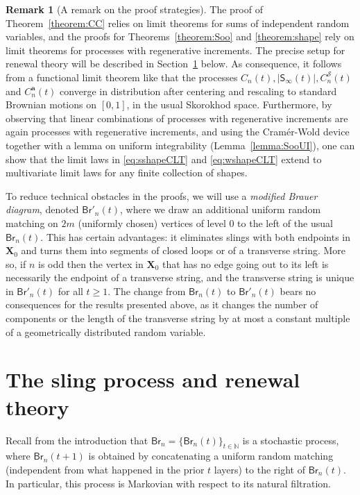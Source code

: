 \documentclass[a4paper,11pt,reqno]{amsart}
\newcommand{\IN}{\mathbb{N}}
\newcommand{\Br}{\mathsf{Br}}
\newcommand{\Soo}{\mathsf{S}_\infty}
\newcommand{\shape}{\mathscr{S}}
\newcommand{\mb}{\mathbf}
\theoremstyle{definition}
\newtheorem{remark}[lemma]{Remark}
\begin{document}
\begin{remark}[A remark on the proof strategies]\label{rem:modified}
 The proof of Theorem~\ref{theorem:CC} relies on limit theorems for sums of independent random variables, and the proofs for Theorems~\ref{theorem:Soo} and \ref{theorem:shape} rely on limit theorems for processes with regenerative increments. The precise setup for renewal theory will be described in Section~\ref{sec:RT} below. 
 As consequence, it follows from a functional limit theorem like \cite[Theorem 5.47]{Serfozo09} that the processes $C_n(t), |\Soo(t)|, C_n^\shape(t)$ and $C_n^{\mb a}(t)$ converge in distribution after centering and rescaling to standard Brownian motions on $[0,1]$, in the usual Skorokhod space. Furthermore, by observing that linear combinations of processes with regenerative increments are again processes with regenerative increments, and using the Cram\'er-Wold device together with a lemma on uniform integrability (Lemma~\ref{lemma:SooUI}), one can show that the limit laws in \eqref{eq:sshapeCLT} and \eqref{eq:wshapeCLT} extend to multivariate limit laws for any finite collection of shapes. 
 
 To reduce technical obstacles in the proofs, we will use a \emph{modified Brauer diagram}, denoted $\Br'_n(t)$, where we draw an additional uniform random matching on $2m$ (uniformly chosen) vertices of level $0$ to the left of the usual $\Br_n(t)$. This has certain advantages: it eliminates slings with both endpoints in $\mb X_0$ and turns them into segments of closed loops or of a transverse string. More so, if $n$ is odd then the vertex in $\mb X_0$ that has no edge going out to its left is necessarily the endpoint of a transverse string, and the transverse string is unique in $\Br'_n(t)$ for all $t \geq 1$. The change from $\Br_n(t)$ to $\Br'_n(t)$ bears no consequences for the results presented above, as it changes the number of components or the length of the transverse string by at most a constant multiple of a geometrically distributed random variable. 
\end{remark}




\section{The sling process and renewal theory} 
\label{sec:RT}

Recall from the introduction that $\Br_n=\{\Br_n(t)\}_{t\in\IN}$ is a stochastic process, where $\Br_n(t+1)$ is obtained by concatenating a uniform random matching (independent from what happened in the prior $t$ layers) to the right of $\Br_n(t)$.  In particular, this process is Markovian with respect to its natural filtration.
\end{document}
